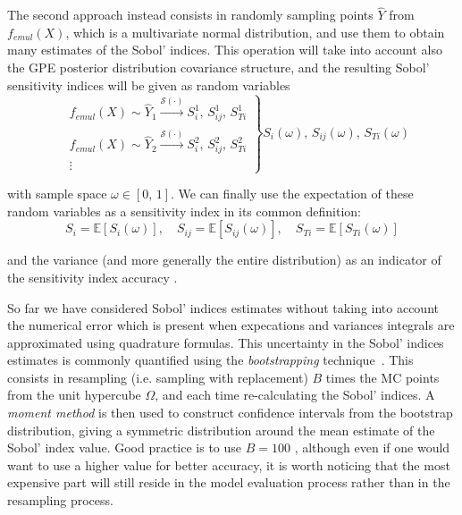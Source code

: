 \noindent
The second approach instead consists in randomly sampling points $\hat{Y}$ from $f_{emul}(X)$, which is a multivariate normal distribution, and use them to obtain many estimates of the Sobol' indices. This operation will take into account also the GPE posterior distribution covariance structure, and the resulting Sobol' sensitivity indices will be given as random variables
%
\begin{equation}\label{eq:emulpostsamplesgsa}
    \left.
        \begin{array}{ll}
            & f_{emul}(X)\sim\hat{Y}_1\xrightarrow[]{\mathcal{S}(\cdot)} S_{i}^{1},\,S_{ij}^{1},\,S_{Ti}^{1} \\
            & f_{emul}(X)\sim\hat{Y}_2\xrightarrow[]{\mathcal{S}(\cdot)} S_{i}^{2},\,S_{ij}^{2},\,S_{Ti}^{2} \\
            & \vdots
        \end{array}
    \right\}S_i(\omega),\,S_{ij}(\omega),\,S_{Ti}(\omega)
\end{equation}

\noindent
with sample space $\omega\in [0,\,1]$. We can finally use the expectation of these random variables as a sensitivity index in its common definition:
%
\begin{equation}
    S_{i} = \mathbb{E}[S_i(\omega)],\quad S_{ij} = \mathbb{E}[S_{ij}(\omega)],\quad S_{Ti} = \mathbb{E}[S_{Ti}(\omega)]
\end{equation}

\noindent
and the variance (and more generally the entire distribution) as an indicator of the sensitivity index accuracy .

\vspace{0.2cm}
So far we have considered Sobol' indices estimates without taking into account the numerical error which is present when expecations and variances integrals are approximated using quadrature formulas. This uncertainty in the Sobol' indices estimates is commonly quantified using the \textit{bootstrapping} technique~\cite{Archer:1997}. This consists in resampling (i.e. sampling with replacement) $B$ times the MC points from the unit hypercube $\Omega$, and each time re-calculating the Sobol' indices. A \textit{moment method} is then used to construct confidence intervals from the bootstrap distribution, giving a symmetric distribution around the mean estimate of the Sobol' index value. Good practice is to use $B=100$ , although even if one would want to use a higher value for better accuracy, it is worth noticing that the most expensive part will still reside in the model evaluation process rather than in the resampling process.

